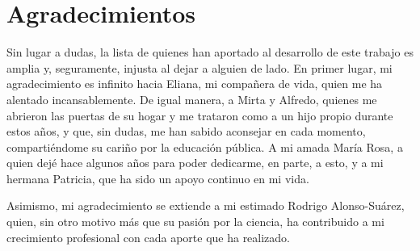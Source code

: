 \chapter*{Agradecimientos}




\noindent Sin lugar a dudas, la lista de quienes han aportado al desarrollo de este trabajo es amplia y, seguramente, injusta al dejar a alguien de lado. En primer lugar, mi agradecimiento es infinito hacia Eliana, mi compañera de vida, quien me ha alentado incansablemente. De igual manera, a Mirta y Alfredo, quienes me abrieron las puertas de su hogar y me trataron como a un hijo propio durante estos años, y que, sin dudas, me han sabido aconsejar en cada momento, compartiéndome su cariño por la educación pública. A mi amada María Rosa, a quien dejé hace algunos años para poder dedicarme, en parte, a esto, y a mi hermana Patricia, que ha sido un apoyo continuo en mi vida.

\noindent Asimismo, mi agradecimiento se extiende a mi estimado Rodrigo Alonso-Suárez, quien, sin otro motivo más que su pasión por la ciencia, ha contribuido a mi crecimiento profesional con cada aporte que ha realizado.
